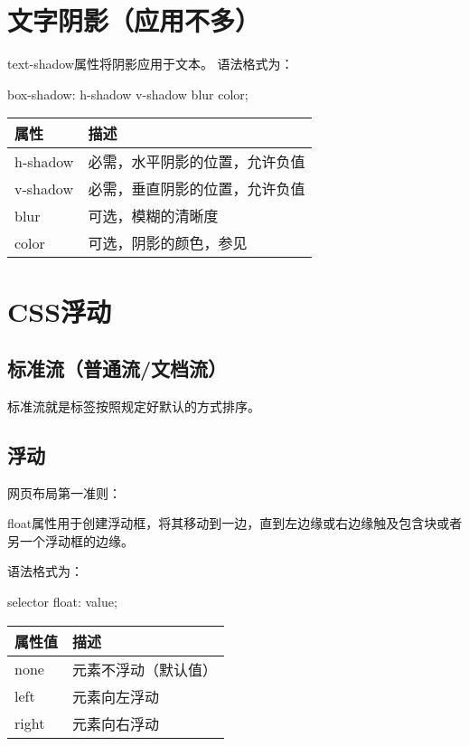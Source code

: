 \section{文字阴影（应用不多）}
text-shadow属性将阴影应用于文本。
语法格式为：
\begin{css}
box-shadow: h-shadow v-shadow blur color;
\end{css}
\begin{table}[H]
    \centering
    \begin{tabular}{ll}
        \hline
        属性&描述\\
        \hline
        h-shadow&必需，水平阴影的位置，允许负值\\
        v-shadow&必需，垂直阴影的位置，允许负值\\
        blur&可选，模糊的清晰度\\
        color&可选，阴影的颜色，参见\nameref{CCS color}\\
        \hline
    \end{tabular}
\end{table}
\section{CSS浮动}
\subsection{标准流（普通流/文档流）}
标准流就是标签按照规定好默认的方式排序。
\subsection{浮动}
网页布局第一准则：

float属性用于创建浮动框，将其移动到一边，直到左边缘或右边缘触及包含块或者另一个浮动框的边缘。

语法格式为：
\begin{css}
selector {
    float: value;
}
\end{css}
\begin{table}[H]
    \centering
    \begin{tabular}{ll}
        \hline
        属性值&描述\\
        \hline
        none&元素不浮动（默认值）\\
        left&元素向左浮动\\
        right&元素向右浮动\\
        \hline
    \end{tabular}
\end{table}
